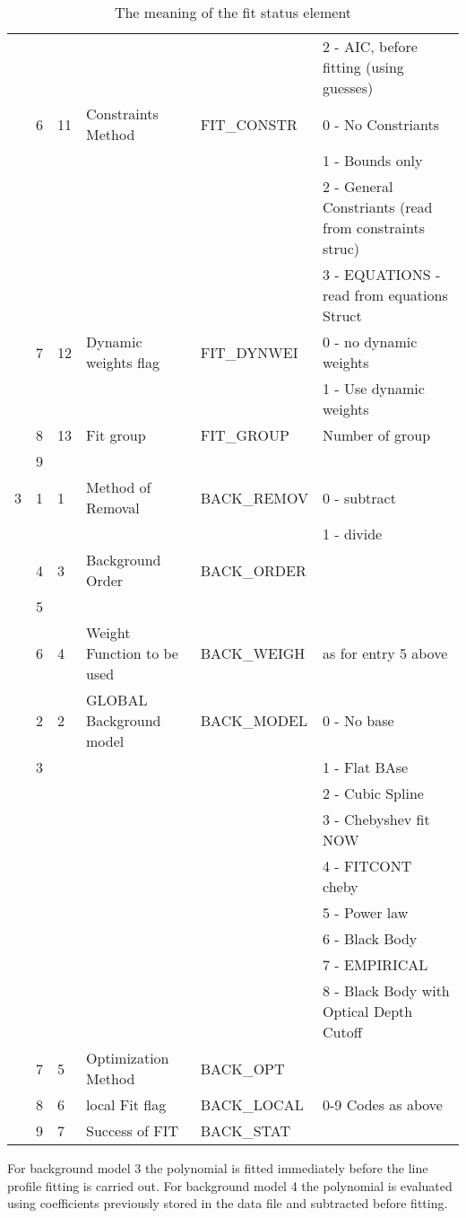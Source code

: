 \begin{table}[ht]
\begin{center}
\begin{tabular}{|l|l|l|l|l|l|}
  &   &   &  & &         2 - AIC, before fitting (using guesses)\\ \cline{2-6}
  & 6 & 11 & Constraints Method & FIT\_CONSTR & 0 - No Constriants\\
  &   &   &  & & 1 - Bounds only\\
  &   &   &  & & 2 - General Constriants (read from constraints struc)\\
  &   &   &  & & 3 - EQUATIONS  -read from equations Struct\\ \cline{2-6}
  & 7 & 12 & Dynamic weights flag & FIT\_DYNWEI & 0 - no dynamic weights\\
  &   &   &  & & 1 - Use dynamic weights\\ \cline{2-6}
  & 8 & 13 & Fit group & FIT\_GROUP & Number of group \\
  & 9 &    & & & \\
\hline
3  & 1 & 1 &Method of Removal & BACK\_REMOV & 0 - subtract \\
  &   &   &                  & & 1 - divide\\
\cline{2-6}
  & 4 & 3 & Background Order & BACK\_ORDER & \\
  & 5 & & & & \\
\cline{2-6}
  & 6 & 4 & Weight Function to be used & BACK\_WEIGH & as for entry 5 above \\
\cline{2-6}
  & 2 & 2 &GLOBAL Background model & BACK\_MODEL & 0 - No base\\
  & 3 &   &                        & & 1 - Flat BAse\\
  &   &   &                        & & 2 - Cubic Spline\\
  &   &   &                        & & 3 - Chebyshev fit NOW\\
  &   &   &                        & & 4 - FITCONT cheby\\
  &   &   &                        & & 5 - Power law\\
  &   &   &                        & & 6 - Black Body\\
  &   &   &                        & & 7 - EMPIRICAL\\
  &   &   &    & & 8 - Black Body with Optical Depth Cutoff\\
\cline{2-6}
 & 7 & 5 & Optimization Method & BACK\_OPT & \\ \cline{2-6}
 & 8 & 6 & local Fit flag & BACK\_LOCAL & 0-9 Codes as above \\ \cline{2-6}
 & 9 & 7 &      Success of FIT & BACK\_STAT & \\
\hline
\end{tabular}
\caption[a]{The meaning of the fit status element}
\label{tb.fitstatus}
\end{center}

For background model 3 the polynomial is fitted immediately before the
line profile fitting is carried out.
For background model 4 the polynomial is evaluated using coefficients
previously stored in the data file and subtracted before fitting.
\end{table}

